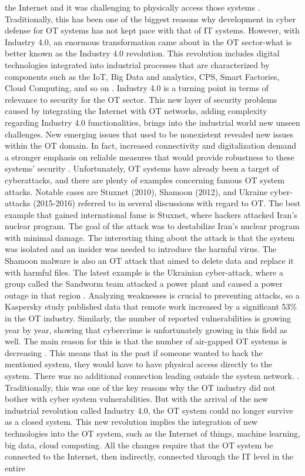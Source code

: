 \documentclass[Master,BMR,english]{twbook}
\begin{document}
the Internet and it was challenging to physically access those systems \cite{conklin_it_2016}. Traditionally, this has been one of the biggest reasons why development in cyber defense for OT systems has not kept pace with that of IT systems. However, with Industry 4.0, an enormous transformation came about in the OT sector-what is better known as the Industry 4.0 revolution. This revolution includes digital technologies integrated into industrial processes that are characterized by components such as the IoT, Big Data and analytics, CPS, Smart Factories, Cloud Computing, and so on \cite{poznan_university_of_technology_poznan_poland_industry_2019}. Industry 4.0 is a turning point in terms of relevance to security for the OT sector. This new layer of security problems caused by integrating the Internet with OT networks, adding complexity regarding Industry 4.0 functionalities, brings into the industrial world new unseen challenges. New emerging issues that used to be nonexistent revealed new issues within the OT domain. In fact, increased connectivity and digitalization demand a stronger emphasis on reliable measures that would provide robustness to these systems' security \cite{ara_security_2022}. Unfortunately, OT systems have already been a target of cyberattacks, and there are plenty of examples concerning famous OT system attacks. Notable cases are Stuxnet (2010), Shamoon (2012), and Ukraine cyber-attacks (2015-2016) referred to in several discussions with regard to OT. The best example that gained international fame is Stuxnet, where hackers attacked Iran's nuclear program. The goal of the attack was to destabilize Iran's nuclear program with minimal damage. The interesting thing about the attack is that the system was isolated and an insider was needed to introduce the harmful virus. The Shamoon malware is also an OT attack that aimed to delete data and replace it with harmful files. The latest example is the Ukrainian cyber-attack, where a group called the Sandworm team attacked a power plant and caused a power outage in that region \cite{pleta_cyber-attacks_2020}.  Analyzing weaknesses is crucial to preventing attacks, so a Kaspersky study published data that remote work increased by a significant 53\% in the OT industry. Similarly, the number of reported vulnerabilities is growing year by year, showing that cybercrime is unfortunately growing in this field as well. The main reason for this is that the number of air-gapped OT systems is decreasing \cite{pospisil_application_2021}.  This means that in the past if someone wanted to hack the mentioned system, they would have to have physical access directly to the system. There was no additional connection leading outside the system network. \cite{conklin_it_2016}. Traditionally, this was one of the key reasons why the OT industry did not bother with cyber system vulnerabilities. But with the arrival of the new industrial revolution called Industry 4.0, the OT system could no longer survive as a closed system. This new revolution implies the integration of new technologies into the OT system, such as the Internet of things, machine learning, big data, cloud computing. All the changes require that the OT system be connected to the Internet, then indirectly, connected through the IT level in the entire 
\end{document}
